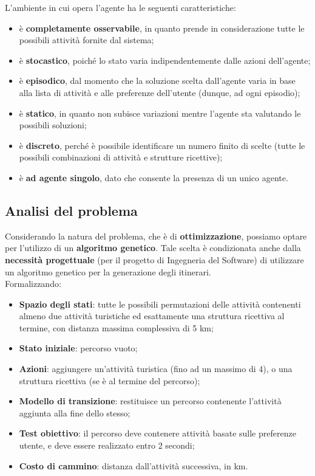 \documentclass{CSUniSchoolLabReport}
\begin{document}
L'ambiente in cui opera l'agente ha le seguenti caratteristiche:
\begin{itemize}
 \item è \textbf{completamente osservabile}, in quanto prende in considerazione tutte le possibili attività fornite dal sistema;
 \item è \textbf{stocastico}, poiché lo stato varia indipendentemente dalle azioni dell'agente;
 \item è \textbf{episodico}, dal momento che la soluzione scelta dall'agente varia in base alla lista di attività e alle preferenze dell'utente (dunque, ad ogni episodio);
 \item è \textbf{statico}, in quanto non subisce variazioni mentre l'agente sta valutando le possibili soluzioni;
 \item è \textbf{discreto}, perché è possibile identificare un numero finito di scelte (tutte le possibili combinazioni di attività e strutture ricettive);
 \item è \textbf{ad agente singolo}, dato che consente la presenza di un unico agente.
\end{itemize}

\pagebreak

\subsection{Analisi del problema}

Considerando la natura del problema, che è di \textbf{ottimizzazione}, possiamo optare per l'utilizzo di un \textbf{algoritmo genetico}. Tale scelta è condizionata anche dalla \textbf{necessità progettuale} (per il progetto di Ingegneria del Software) di utilizzare un algoritmo genetico per la generazione degli itinerari. \\
Formalizzando:
\begin{itemize}
    \item \textbf{Spazio degli stati}: tutte le possibili permutazioni delle attività contenenti almeno due attività turistiche ed esattamente una struttura ricettiva al termine, con distanza massima complessiva di 5 km;
    \item \textbf{Stato iniziale}: percorso vuoto;
    \item \textbf{Azioni}: aggiungere un'attività turistica (fino ad un massimo di 4), o una struttura ricettiva (se è al termine del percorso);
    \item \textbf{Modello di transizione}: restituisce un percorso contenente l'attività aggiunta alla fine dello stesso;
    \item \textbf{Test obiettivo}: il percorso deve contenere attività basate sulle preferenze utente, e deve essere realizzato entro 2 secondi;
    \item \textbf{Costo di cammino}: distanza dall'attività successiva, in km.
\end{itemize}
\end{document}
